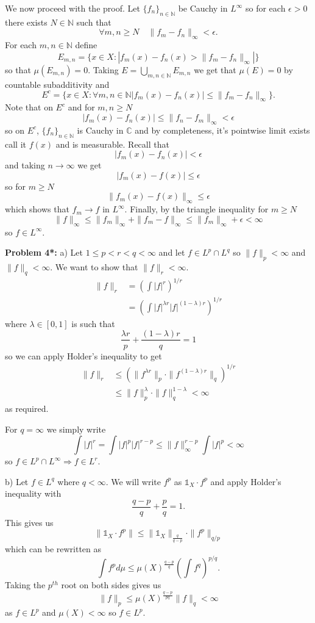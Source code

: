 \documentclass[12pt]{amsart} %
\def\N{\mathbb{N}}
\def\C{\mathbb{C}}
\def\1{\mathbb{1}}
\begin{document}
 We now proceed with the proof. Let $\{f_n\}_{n \in \N}$ be Cauchy in $L^\infty$ so for each $\epsilon>0$ there exists $N \in \N$ such that $$\forall m,n \ge  N \quad \|f_m - f_n\|_\infty
 < \epsilon.$$ For each $m,n \in \N$ define $$E_{m,n} = \{x \in X: |f_m(x) - f_n(x) > \|f_m - f_n\|_\infty|\} $$ so that $\mu(E_{m,n}) = 0$. Taking $E = \bigcup_{m,n \in \N} E_{m,n}$ we get that $\mu(E) = 0$ by countable subadditivity and $$E^c = \{x \in X: \forall m,n \in \N |f_m(x) - f_n(x)| \le  \|f_m - f_n\|_\infty\}.$$ Note that on $E^c$ and for  $m,n \ge N$ $$
 |f_m(x) - f_n(x)| \le  \|f_n - f_m\|_\infty < \epsilon$$ so on $E^c$, $\{f_n\}_{n \in \N}$ is Cauchy in $\C$ and by completeness, it's pointwise limit exists call it  $f(x)$ and is measurable. Recall that $$|f_m(x) - f_n(x)| < \epsilon$$  and taking $n \to \infty$ we get $$|f_m(x) - f(x)| \le  \epsilon$$ so for $m \ge  N$ $$\|f_m(x) - f(x)\|_\infty \le  \epsilon$$ which shows that $f_m \to f$ in $L^\infty$. Finally, by the triangle inequality for $m \ge N$ $$
 \|f\|_\infty \le \|f_m\|_\infty + \|f_m - f\|_\infty \le  \|f_m\|_\infty + \epsilon < \infty$$ so $f \in L^\infty$. 





  
  \bigskip
\noindent
\textbf{Problem 4*:} 
\smallskip
a) Let $1\le p< r<q < \infty$ and let $f \in L^p\cap L^q$ so $\|f\|_p < \infty$ and $\|f\|_q < \infty$. We want to show that $\|f\|_r < \infty$. 
\begin{align*}
	\|f\|_r &= \left( \int |f|^r \right)^{1/r} \\
		&= \left( \int |f|^{\lambda r} |f|^{(1-\lambda)r} \right)^{1/r}
\end{align*}
where $\lambda \in [0,1]$ is such that  $$\frac{\lambda r}{p} + \frac{(1-\lambda) r}{q} = 1$$ so we can apply Holder's inequality to get 
\begin{align*}
	\|f\|_r & \le  \left( \|f^{\lambda r}\|_p \cdot \|f^{(1-\lambda)r}\|_q \right)^{1/r} \\
		& \le   \|f\|_p^{\lambda} \cdot \|f\|_q^{1-\lambda} < \infty
\end{align*}
as required. 

For $q = \infty$ we simply write $$ \int |f|^r = \int |f|^p |f|^{r-p} \le \|f\|^{r-p}_\infty \int|f|^p< \infty$$ so $f \in L^p \cap L^\infty \Rightarrow f \in L^r$.

\smallskip
b) Let $f \in L^q$ where $q < \infty$. We will write $f^p$ as  $\1_{X}\cdot f^p$ and apply Holder's inequality with  $$\frac{q-p}{q} + \frac{p}{q} = 1.$$ This gives us $$
\|\1_X \cdot f^p\| \le \|\1_X\|_{\frac{q}{q-p}}\cdot\|f^p\|_{q/p}
$$ which can be rewritten as $$\int f^p d\mu \le \mu(X)^{\frac{q-p}{q}} \left( \int f^q \right)^{p/q}. 
$$ Taking the $p^{th}$ root on both sides gives us $$\|f\|_p \le  \mu(X)^{\frac{q-p}{pq}} \|f\|_q < \infty$$ as $f \in L^p$ and $\mu(X) < \infty$ so $f \in L^p$.
\end{document}
